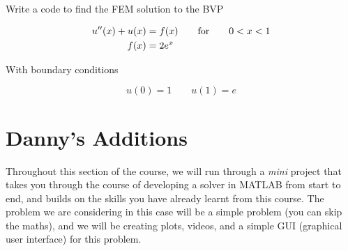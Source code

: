 \documentclass[12pt]{report}
\begin{document}
\begin{tcolorbox}[title=Task (Difficult)]
Write a code to find the FEM solution to the BVP

\begin{equation}\label{BVPd}
\begin{split}
u''(x)+u(x)&=f(x)\qquad\textnormal{for}\qquad{0}<x<1\\
f(x)&=2e^x
\end{split}
\end{equation}

With boundary conditions 

\begin{equation*}
u(0)=1\qquad{u}(1)=e
\end{equation*}
\end{tcolorbox}

\section*{Danny's Additions}
Throughout this section of the course, we will run through a \textit{mini} project that takes you through the course of developing a solver in MATLAB from start to end, and builds on the skills you have already learnt from this course. The problem we are considering in this case will be a simple problem (you can skip the maths), and we will be creating plots, videos, and a simple GUI (graphical user interface) for this problem.
\end{document}
